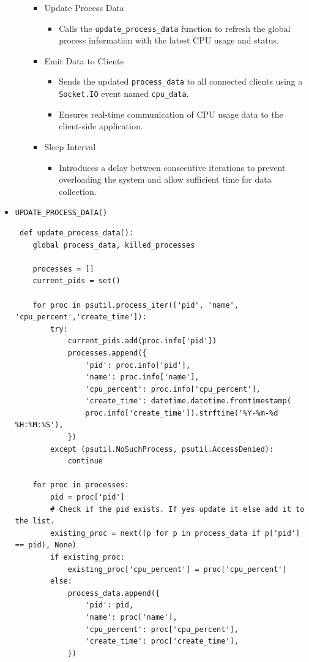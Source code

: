 \documentclass[12pt]{article}
\begin{document}
\begin{itemize}
\begin{itemize}
\begin{itemize}
\item {Update Process Data}
\begin{itemize}
    \item Calls the \texttt{update\_process\_data} function to refresh the global process information with the latest CPU usage and status.
\end{itemize}

\item {Emit Data to Clients}
\begin{itemize}
    \item Sends the updated \texttt{process\_data} to all connected clients using a \texttt{Socket.IO} event named \texttt{cpu\_data}.
    \item Ensures real-time communication of CPU usage data to the client-side application.
\end{itemize}

\item {Sleep Interval}
\begin{itemize}
    \item Introduces a delay between consecutive iterations to prevent overloading the system and allow sufficient time for data collection.
\end{itemize}
   \end{itemize}


\end{itemize}

\item \texttt{UPDATE\_PROCESS\_DATA()}
    \begin{verbatim}
 def update_process_data():
    global process_data, killed_processes
    
    processes = []
    current_pids = set()

    for proc in psutil.process_iter(['pid', 'name', 'cpu_percent','create_time']):
        try:
            current_pids.add(proc.info['pid'])
            processes.append({
                'pid': proc.info['pid'],
                'name': proc.info['name'],
                'cpu_percent': proc.info['cpu_percent'],
                'create_time': datetime.datetime.fromtimestamp(
                proc.info['create_time']).strftime('%Y-%m-%d %H:%M:%S'),
            })
        except (psutil.NoSuchProcess, psutil.AccessDenied):
            continue

    for proc in processes:
        pid = proc['pid']
        # Check if the pid exists. If yes update it else add it to the list.
        existing_proc = next((p for p in process_data if p['pid'] == pid), None)
        if existing_proc:
            existing_proc['cpu_percent'] = proc['cpu_percent']
        else:
            process_data.append({
                'pid': pid,
                'name': proc['name'],
                'cpu_percent': proc['cpu_percent'],
                'create_time': proc['create_time'],
            })


\end{verbatim}
\end{itemize}
\end{document}
